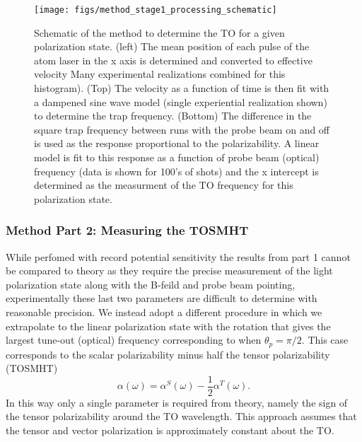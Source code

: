 \documentclass[aps,prl,
,reprint,
superscriptaddress,
onecolumn,
showpacs,preprintnumbers,
 amsmath,amssymb,
]{revtex4-1}
\begin{document}
\begin{figure}
\centering
\texttt{[image: figs/method\_stage1\_processing\_schematic]}
\caption{
Schematic of the method to determine the TO for a given polarization state. (left) The mean position of each pulse of the atom laser in the x axis is determined and converted to effective velocity Many experimental realizations combined for this histogram).  (Top) The velocity as a function of time is then fit with a dampened sine wave model (single experiential realization shown) to determine the trap frequency. (Bottom) The difference in the square trap frequency between runs with the probe beam on and off is used as the response proportional to the polarizability. A linear model is fit to this response as a function of probe beam (optical) frequency (data is shown for 100's of shots) and the x intercept is determined as the measurment of the TO frequency for this polarization state.}
\label{fig:stage_1_processing_schematic} 
\end{figure}

\subsubsection{Method Part 2: Measuring the TOSMHT}
While perfomed with record potential sensitivity the results from part 1 cannot be compared to theory as they require the precise measurement of the light polarization state along with the B-feild and probe beam pointing, experimentally these last two parameters are difficult to determine with reasonable precision. We instead adopt a different procedure in which we extrapolate to the linear polarization state with the rotation that gives the largest tune-out (optical) frequency corresponding to when $\theta_p=\pi/2$. This case corresponds to the scalar polarizability minus half the tensor polarizability (TOSMHT)
\begin{equation}
    \alpha(\omega) = \alpha^S(\omega) - \frac{1}{2}  \alpha^T(\omega) .
\end{equation}
In this way only a single parameter is required from theory, namely the sign of the tensor polarizability around the TO wavelength. This approach assumes that the tensor and vector polarization is approximately constant about the TO.
\end{document}
